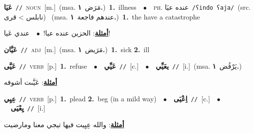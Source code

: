 \documentclass[10pt,a4paper,twoside]{article} %
\begin{document}
\begin{multicols}{2}
{\setlength\topsep{0pt}\textbf{\foreignlanguage{arabic}{عَيَا}}\ {\color{gray}\texttt{//}\color{black}}\ \textsc{noun}\ [m.]\ \color{gray}(msa. \foreignlanguage{arabic}{مَرَض}~\foreignlanguage{arabic}{\textbf{١.}})\color{black}\ \textbf{1.}~illness\ \ $\bullet$\ \ \textsc{ph.} \color{gray} \foreignlanguage{arabic}{عنده عيَا}\color{black}\ {\color{gray}\texttt{/{\sffamily ʕindo ʕaja}/}\color{black}}\ \color{gray}(src. \foreignlanguage{arabic}{نابلس > قرى})\color{black}\ \color{gray} (msa. \foreignlanguage{arabic}{عندهم فاجعة}~\foreignlanguage{arabic}{\textbf{١.}})\color{black}\ \textbf{1.}~the have a catastrophe\  \begin{flushright}\color{gray}\foreignlanguage{arabic}{\textbf{\underline{\foreignlanguage{arabic}{أمثلة}}}: الحزين عنده عيا!\ $\bullet$\ \  عندي عَيا!}\end{flushright}\color{black}} \vspace{2mm}

{\setlength\topsep{0pt}\textbf{\foreignlanguage{arabic}{عَيَّان}}\ {\color{gray}\texttt{//}\color{black}}\ \textsc{adj}\ [m.]\ \color{gray}(msa. \foreignlanguage{arabic}{مَرَيض}~\foreignlanguage{arabic}{\textbf{١.}})\color{black}\ \textbf{1.}~sick  \textbf{2.}~ill\ } \vspace{2mm}

{\setlength\topsep{0pt}\textbf{\foreignlanguage{arabic}{عَيَّى}}\ {\color{gray}\texttt{//}\color{black}}\ \textsc{verb}\ [p.]\ \textbf{1.}~refuse\ \ $\bullet$\ \ \setlength\topsep{0pt}\textbf{\foreignlanguage{arabic}{عَيِّي}}\ {\color{gray}\texttt{//}\color{black}}\ [c.]\ \ $\bullet$\ \ \setlength\topsep{0pt}\textbf{\foreignlanguage{arabic}{يعَيِّي}}\ {\color{gray}\texttt{//}\color{black}}\ [i.]\ \color{gray}(msa. \foreignlanguage{arabic}{يَرْفُض}~\foreignlanguage{arabic}{\textbf{١.}})\color{black}\  \begin{flushright}\color{gray}\foreignlanguage{arabic}{\textbf{\underline{\foreignlanguage{arabic}{أمثلة}}}: عَيَّىت أشوفه}\end{flushright}\color{black}} \vspace{2mm}

{\setlength\topsep{0pt}\textbf{\foreignlanguage{arabic}{عِيِي}}\ {\color{gray}\texttt{//}\color{black}}\ \textsc{verb}\ [p.]\ \textbf{1.}~plead  \textbf{2.}~beg (in a mild way)\ \ $\bullet$\ \ \setlength\topsep{0pt}\textbf{\foreignlanguage{arabic}{اِعْيَى}}\ {\color{gray}\texttt{//}\color{black}}\ [c.]\ \ $\bullet$\ \ \setlength\topsep{0pt}\textbf{\foreignlanguage{arabic}{يِعْيَى}}\ {\color{gray}\texttt{//}\color{black}}\ [i.]\  \begin{flushright}\color{gray}\foreignlanguage{arabic}{\textbf{\underline{\foreignlanguage{arabic}{أمثلة}}}: والله عِيِيت فيها تيجي معنا ومارضيت}\end{flushright}\color{black}} \vspace{2mm}


\end{multicols}
\end{document}
